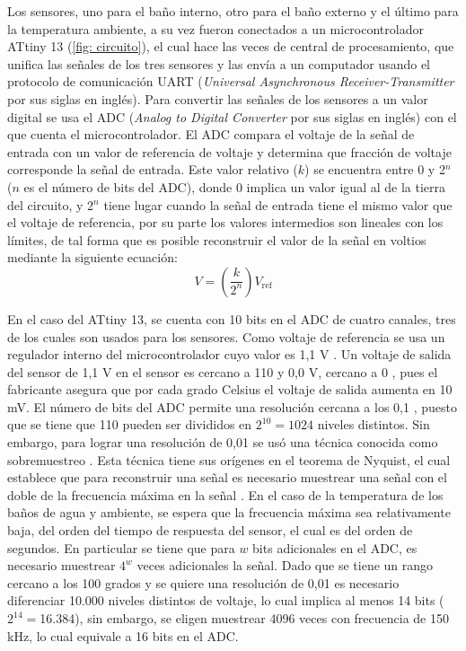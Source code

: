 	Los sensores, uno para el baño interno, otro para el baño externo y el \'ultimo para la temperatura ambiente, a su vez fueron conectados a un microcontrolador ATtiny 13 \cite{attiny13} (\autoref{fig: circuito}), el cual hace las veces de central de procesamiento, que unifica las señales de los tres sensores y las envía a un computador usando el protocolo de comunicación UART (\textit{Universal Asynchronous Receiver-Transmitter} por sus siglas en inglés). Para convertir las señales de los sensores a un valor digital se usa el ADC (\textit{Analog to Digital Converter} por sus siglas en inglés) con el que cuenta el microcontrolador. El ADC compara el voltaje de la señal de entrada con un valor de referencia de voltaje y determina que fracción de voltaje corresponde la señal de entrada. Este valor relativo ($k$) se encuentra entre 0 y 2$^{n}$ ($n$ es el número de bits del ADC), donde 0 implica un valor igual al de la tierra del circuito, y 2$^n$ tiene lugar cuando la señal de entrada tiene el mismo valor que el voltaje de referencia, por su parte los valores intermedios son lineales con los límites, de tal forma que es posible reconstruir el valor de la señal en voltios mediante la siguiente ecuación:
	\begin{equation}
		V = \left(\dfrac{k}{2^n}\right)V_{\text{ref}}
	\end{equation}
	
	En el caso del ATtiny 13, se cuenta con 10 bits en el ADC de cuatro canales, tres de los cuales son usados para los sensores. Como voltaje de referencia se usa un regulador interno del microcontrolador cuyo valor es 1,1 V \cite{attiny13}. Un voltaje de salida del sensor de 1,1 V en el sensor es cercano a 110 \grad{} y 0,0 V, cercano a 0 \grad{}, pues el fabricante asegura que por cada grado Celsius el voltaje de salida aumenta en 10 mV. El número de bits del ADC permite una resolución cercana a los 0,1 \grad{}, puesto que se tiene que 110 \grad{} pueden ser divididos en $2^{10} = 1024$ niveles distintos. Sin embargo, para lograr una resolución de 0,01 \grad{} se usó una técnica conocida como sobremuestreo \cite{grewal2006oversampling}. Esta técnica tiene sus orígenes en el teorema de Nyquist, el cual establece que para reconstruir una señal es necesario muestrear una señal con el doble de la frecuencia m\'axima en la señal \cite{alexander2009fundamentals}. En el caso de la temperatura de los baños de agua y ambiente, se espera que la frecuencia máxima sea relativamente baja, del orden del tiempo de respuesta del sensor, el cual es del orden de segundos. En particular se tiene que para $w$ bits adicionales en el ADC, es necesario muestrear $4^w$ veces adicionales la señal. Dado que se tiene un rango cercano a los 100 grados y se quiere una resolución de 0,01 \grad{} es necesario diferenciar 10.000 niveles distintos de voltaje, lo cual implica al menos 14 bits ($2^{14}=$16.384), sin embargo, se eligen muestrear 4096 veces con frecuencia de 150 kHz, lo cual equivale a 16 bits en el ADC.
	
